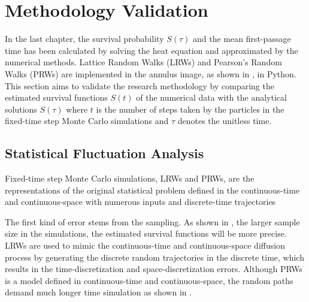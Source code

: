 \section{Methodology Validation}

In the last chapter, the survival probability $S(\tau)$ and the mean
first-passage time has been calculated by solving the heat equation
and approximated by the numerical methods. Lattice Random Walks (LRWs)
and Pearson's Random Walks (PRWs) are implemented in the annulus
image, as shown in , in Python. This section aims to
validate the research methodology by comparing the estimated survival
functions $S(t)$ of the numerical data with the analytical solutions
$S(\tau)$ where $t$ is the number of steps taken by the particles in
the fixed-time step Monte Carlo simulations and $\tau$ denotes the
unitless time.


\subsection{Statistical Fluctuation Analysis}

Fixed-time step Monte Carlo simulations, LRWs and PRWs, are the
 representations of the original statistical problem defined in
the continuous-time and continuous-space with numerous inputs and
discrete-time trajectories  

The first kind of error stems from the sampling. As shown in , the larger sample size in the simulations, the estimated
survival functions will be more precise. LRWs are used to mimic the
continuous-time and continuous-space diffusion process by generating
the discrete random trajectories in the discrete time, which results
in the time-discretization and space-discretization errors. Although
PRWs is a model defined in continuous-time and continuous-space, the
random paths demand much longer time simulation as shown in .

